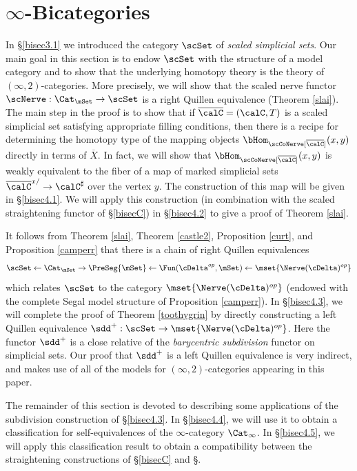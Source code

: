 \section{\texorpdfstring{$\infty$}{infinity}-Bicategories}\label{bisecD}

In \S \ref{bisec3.1} we introduced the category $\scSet$ of {\it scaled simplicial sets}.
Our main goal in this section is to endow $\scSet$ with the structure of a model category
and to show that the underlying homotopy theory is the theory of $(\infty,2)$-categories.
More precisely, we will show that the scaled nerve functor
$\scNerve: \Cat_{\mSet} \rightarrow \scSet$ is a right Quillen equivalence
(Theorem \ref{slai}). The main step in the proof is to show that if
$\overline{\calC}= (\calC,T)$ is a scaled simplicial set satisfying appropriate filling conditions,
then there is a recipe for determining the homotopy type of the mapping objects $\bHom_{ \scCoNerve[ \overline{\calC}]}(x,y)$ directly in terms of $\overline{X}$. In fact, we will show that
$\bHom_{ \scCoNerve[ \overline{\calC}]}(x,y)$ is weakly equivalent to the fiber of a map
of marked simplicial sets $\overline{\calC}^{x/} \rightarrow \calC^{\sharp}$ over the vertex $y$.
The construction of this map will be given in \S \ref{bisec4.1}. We will apply this construction
(in combination with the scaled straightening functor of \S \ref{bisecC}) in
\S \ref{bisec4.2} to give a proof of Theorem \ref{slai}.

It follows from Theorem \ref{slai}, Theorem \ref{castle2}, Proposition \ref{curt}, and
Proposition \ref{camperr} that there is a chain of right Quillen equivalences
$$ \scSet \leftarrow \Cat_{\mSet} \rightarrow \PreSeg{\mSet} \leftarrow
\Fun( \cDelta^{op}, \mSet) \leftarrow \mset{ \Nerve(\cDelta)^{op} }$$
which relates $\scSet$ to the category $\mset{ \Nerve(\cDelta)^{op} }$
(endowed with the complete Segal model structure of Proposition
\ref{camperr}). In \S \ref{bisec4.3}, we will complete the proof of
Theorem \ref{toothygrin} by directly constructing a left Quillen equivalence
$\sdd^{+}: \scSet \rightarrow \mset{ \Nerve(\cDelta)^{op} }$.
Here the functor $\sdd^{+}$ is a close relative of the {\it barycentric subdivision}
functor on simplicial sets. Our proof that $\sdd^{+}$ is a left Quillen equivalence is very indirect,
and makes use of all of the models for $(\infty,2)$-categories appearing in this paper.

The remainder of this section is devoted to describing some applications of 
the subdivision construction of \S \ref{bisec4.3}. In \S \ref{bisec4.4}, we will use it to obtain
a classification for self-equivalences of the $\infty$-category $\Cat_{\infty}$.
In \S \ref{bisec4.5}, we will apply this classification result to obtain a compatibility between
the straightening constructions of \S \ref{bisecC} and \S {}.


